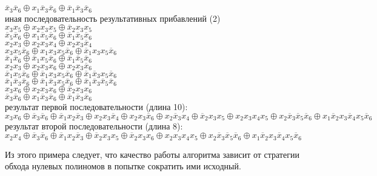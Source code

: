 \documentclass[a4paper,12pt,titlepage,finall]{article}
\begin{document}
$ \overline x_3 \overline x_6 \oplus x_1 \overline x_3 \overline x_6 \oplus \overline x_1 \overline x_3 \overline x_6 $ \\
иная последовательность результативных прибавлений (2)\\
$ x_3 x_5 \oplus x_2 x_3 x_5 \oplus \overline x_2 x_3 x_5 $ \\
$ \overline x_5 \overline x_6 \oplus x_1 \overline x_5 \overline x_6 \oplus \overline x_1 \overline x_5 \overline x_6 $ \\
$ x_2 x_3 \oplus x_2 x_3 x_4 \oplus x_2 x_3 \overline x_4 $ \\
$ x_3 x_5 \overline x_6 \oplus x_1 x_3 x_5 \overline x_6 \oplus \overline x_1 x_3 x_5 \overline x_6 $ \\
$ \overline x_1 \overline x_6 \oplus \overline x_1 x_5 \overline x_6 \oplus \overline x_1 \overline x_5 \overline x_6 $ \\
$ x_2 x_3 \oplus x_2 x_3 x_6 \oplus x_2 x_3 \overline x_6 $ \\
$ \overline x_1 x_5 \overline x_6 \oplus \overline x_1 x_3 x_5 \overline x_6 \oplus \overline x_1 \overline x_3 x_5 \overline x_6 $ \\
$ \overline x_1 \overline x_3 \overline x_6 \oplus \overline x_1 \overline x_3 x_5 \overline x_6 \oplus \overline x_1 \overline x_3 \overline x_5 \overline x_6 $ \\
$ x_3 x_6 \oplus x_2 x_3 x_6 \oplus \overline x_2 x_3 x_6 $ \\
$ \overline x_3 \overline x_6 \oplus x_1 \overline x_3 \overline x_6 \oplus \overline x_1 \overline x_3 \overline x_6 $ \\
результат первой последовательности (длина 10):\\
$ x_3 x_6 \oplus \overline x_3 \overline x_6 \oplus \overline x_1 x_2 \overline x_3 \oplus x_2 x_3 \overline x_4 \oplus x_2 x_3 \overline x_6 \oplus x_2 \overline x_3 x_4 \oplus \overline x_2 x_3 x_5 \oplus x_2 x_3 x_4 x_5 \oplus x_2 \overline x_3 \overline x_5 \overline x_6 \oplus x_1 \overline x_2 x_3 \overline x_4 x_5 \overline x_6 $ \\
результат второй последовательности (длина 8):\\
$ x_2 x_4 \oplus \overline x_3 \overline x_6 \oplus \overline x_1 x_2 \overline x_3 \oplus \overline x_2 x_3 x_5 \oplus \overline x_2 x_3 x_6 \oplus x_2 x_3 x_4 x_5 \oplus x_2 \overline x_3 \overline x_5 \overline x_6 \oplus x_1 \overline x_2 x_3 \overline x_4 x_5 \overline x_6 $

Из этого примера следует, что качество работы алгоритма зависит от стратегии обхода нулевых полиномов в попытке сократить ими исходный.
\end{document}
